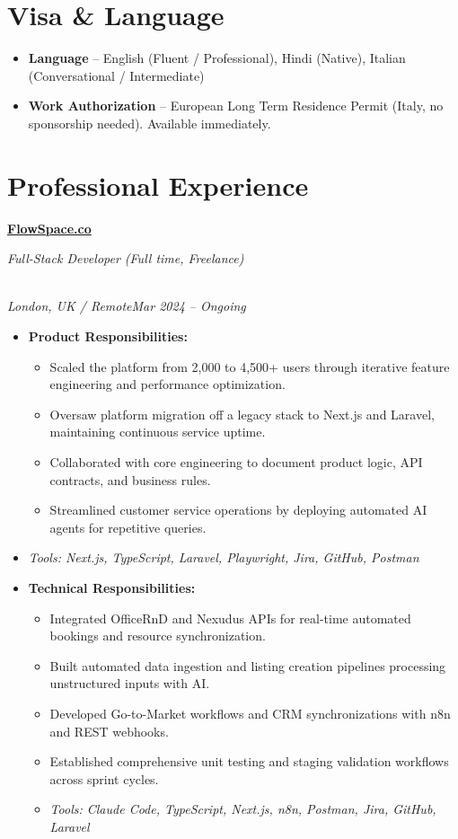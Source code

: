\documentclass[a4paper,10pt]{article}
\newcommand{\role}[4]{\vspace{3pt}\noindent\hspace{0.6em}\parbox[t]{0.38\textwidth}{\raggedright\textbf{#1}}\hfill\parbox[t]{0.58\textwidth}{\raggedleft\textit{#2}}\\{\textit{#3}\hfill\textit{#4}}\vspace{1pt}}
\begin{document}
\section{Visa \& Language}
\begin{itemize}
\item \textbf{Language} -- English (Fluent / Professional), Hindi (Native), Italian (Conversational / Intermediate)
\item \textbf{Work Authorization} -- European Long Term Residence Permit (Italy, no sponsorship needed). Available immediately.
\end{itemize}

\section{Professional Experience}
\role{\href{https://flowspace.co}{FlowSpace.co}}{Full-Stack Developer (Full time, Freelance)}{London, UK / Remote}{Mar 2024 -- Ongoing}
\begin{itemize}
\item \textbf{Product Responsibilities:}
\begin{itemize}[label=--]
\item Scaled the platform from 2,000 to 4,500+ users through iterative feature engineering and performance optimization.
\item Oversaw platform migration off a legacy stack to Next.js and Laravel, maintaining continuous service uptime.
\item Collaborated with core engineering to document product logic, API contracts, and business rules.
\item Streamlined customer service operations by deploying automated AI agents for repetitive queries.
\end{itemize}
\item \textit{Tools: Next.js, TypeScript, Laravel, Playwright, Jira, GitHub, Postman}
\item \textbf{Technical Responsibilities:}
\begin{itemize}[label=--]
\item Integrated OfficeRnD and Nexudus APIs for real-time automated bookings and resource synchronization.
\item Built automated data ingestion and listing creation pipelines processing unstructured inputs with AI.
\item Developed Go-to-Market workflows and CRM synchronizations with n8n and REST webhooks.
\item Established comprehensive unit testing and staging validation workflows across sprint cycles.
\item \textit{Tools: Claude Code, TypeScript, Next.js, n8n, Postman, Jira, GitHub, Laravel}
\end{itemize}
\end{itemize}
\end{document}
